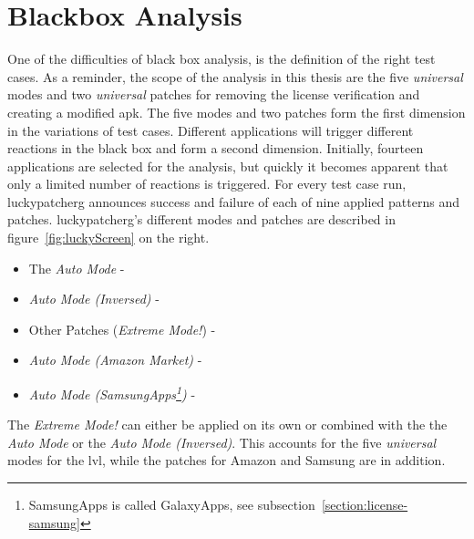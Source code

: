 \section{Blackbox Analysis} \label{section:luckypatcher-blackbox}
One of the difficulties of black box analysis, is the definition of the right test cases.
As a reminder, the scope of the analysis in this thesis are the five \textit{universal} modes and two \textit{universal} patches for removing the license verification and creating a modified \gls{apk}.
The five modes and two patches form the first dimension in the variations of test cases.
Different applications will trigger different reactions in the black box and form a second dimension.
\newline
Initially, fourteen applications are selected for the analysis, but quickly it becomes apparent that only a limited number of reactions is triggered.
For every test case run, \gls{luckypatcherg} announces success and failure of each of nine applied patterns and patches.
\newpage
\gls{luckypatcherg}’s different modes and patches are described in figure~\ref{fig:luckyScreen} on the right.
\begin{itemize}
\item The \textit{Auto Mode} - \grqq
\item \textit{Auto Mode (Inversed)} - \grqq
\item Other Patches (\textit{Extreme Mode!}) - \grqq
\item \textit{Auto Mode (Amazon Market)} - \grqq
\item \textit{Auto Mode (SamsungApps\footnote[1]{SamsungApps is called GalaxyApps, see subsection~\ref{section:license-samsung}})} - \grqq
\end{itemize}
The \textit{Extreme Mode!} can either be applied on its own or combined with the the \textit{Auto Mode} or the \textit{Auto Mode (Inversed)}.
This accounts for the five \textit{universal} modes for the \gls{lvl}, while the patches for Amazon and Samsung are in addition.
\newline
